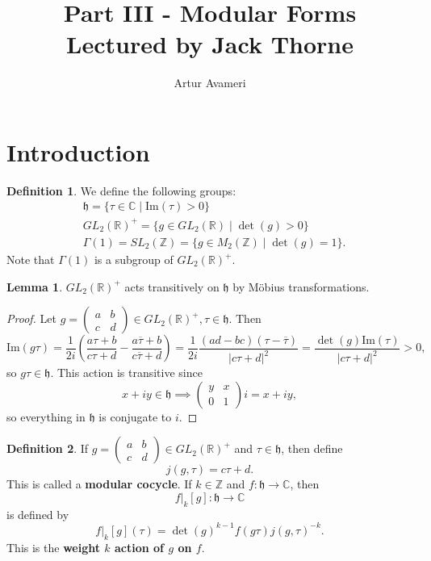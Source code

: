 \documentclass{article}
\title{Part III - Modular Forms
    \\ \large
    Lectured by Jack Thorne
}
\author{Artur Avameri}
\date{}
\theoremstyle{definition}
\newtheorem{lemma}[theorem]{Lemma}
\newtheorem{defn}{Definition}[section]
\begin{document}
\maketitle
\tableofcontents
\newpage

\section{Introduction}


\begin{defn}
    We define the following groups:
    \begin{align*}
        &\mathfrak{h} = \{\tau \in \mathbb{C} \mid \text{Im}(\tau)>0\}\\
        &GL_2(\mathbb{R})^{+} = \{g \in GL_2(\mathbb{R}) \mid \det(g)>0\}\\
        &\Gamma(1) = SL_2(\mathbb{Z}) = \{g \in M_2(\mathbb{Z}) \mid  \det(g)=1\} .
    \end{align*}
    Note that $\Gamma(1)$ is a subgroup of $GL_2(\mathbb{R})^+$.
\end{defn}
\begin{lemma}
    $GL_2(\mathbb{R})^+$ acts transitively on $\mathfrak{h}$ by Möbius transformations.
\end{lemma}
\begin{proof}
    Let $g = \begin{pmatrix} a & b\\c&d \end{pmatrix} \in GL_2(\mathbb{R})^+, \tau \in \mathfrak{h}$. Then \[
    \text{Im}(g \tau) = \frac{1}{2i}\left(\frac{a \tau + b}{c \tau + d} - \frac{a \overline{\tau}+ b}{c \overline{\tau } + d} \right) = \frac{1}{2i} \frac{(ad-bc)(\tau - \overline{\tau})}{|c \tau + d|^2} = \frac{\det(g) \text{Im}(\tau)}{|c \tau + d |^2} > 0,
    \]
    so $g \tau \in \mathfrak{h}$. This action is transitive since \[
    x + iy  \in \mathfrak{h} \implies \begin{pmatrix} y & x \\ 0 & 1 \end{pmatrix} i  = x + iy,
    \]
    so everything in $\mathfrak{h}$ is conjugate to $i$.   
\end{proof}
\begin{defn}
    If $g = \begin{pmatrix} a & b\\ c & d\end{pmatrix}\in GL_2(\mathbb{R})^+$ and $\tau \in \mathfrak{h}$, then define \[
    j(g, \tau) =  c \tau + d.
    \]
    This is called a \textbf{modular cocycle}.
    If $k \in \mathbb{Z}$ and $f : \mathfrak{h} \to \mathbb{C}$, then \[
    f |_k[g]: \mathfrak{h} \to \mathbb{C}
    \]
    is defined by \[
    f |_k[g](\tau) = \det(g)^{k-1} f(g \tau) j(g, \tau)^{-k}.
    \]
    This is the \textbf{weight $k$ action of $g$ on $f$}.
\end{defn}
\end{document}
